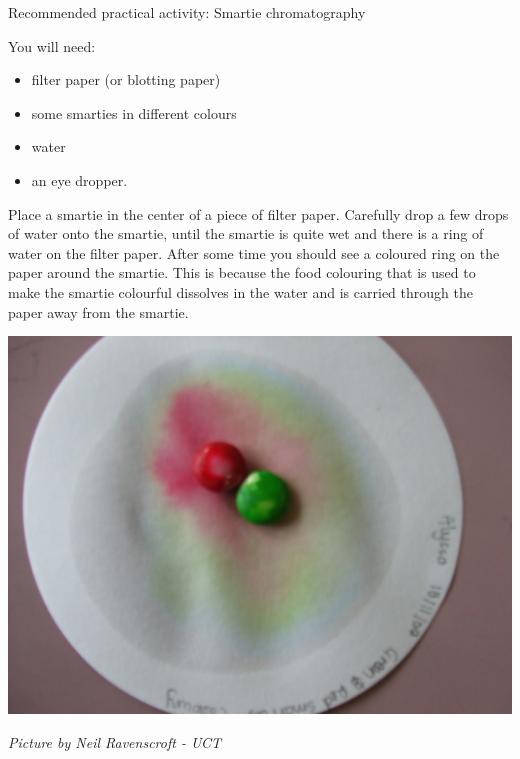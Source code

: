 \begin{activity}{Recommended practical activity: Smartie chromatography}{
\begin{minipage}{.5\textwidth}
You will need:
\begin{itemize}
\item filter paper (or blotting paper)
\item some smarties in different colours
\item water
\item an eye dropper.
\end{itemize}
Place a smartie in the center of a piece of filter paper. Carefully drop a few drops of water onto the smartie, until the smartie is quite wet and there is a ring of water on the filter paper. After some time you should see a coloured ring on the paper around the smartie. This is because the food colouring that is used to make the smartie colourful dissolves in the water and is carried through the paper away from the smartie. 
\end{minipage}
\begin{minipage}{.5\textwidth}
\begin{center}
 \includegraphics[width=.8\textwidth]{photos/smartie2.jpg}\par
\textit{Picture by Neil Ravenscroft - UCT}
\end{center}
\end{minipage}
}
\end{activity}
\par 
	\par
      \label{m38708*uid25}
